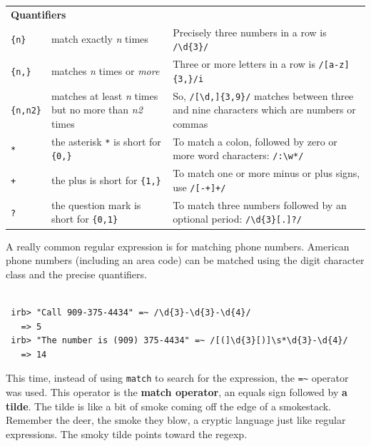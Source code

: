 \documentclass[10pt,twoside]{report}
\begin{document}
\begin{tabular}{p{}p{}p{}}
\multicolumn{3}{l}{\bf Quantifiers }
\\ \lstinline[breaklines=true]|{n}| & match exactly {\em n} times &
Precisely three numbers in a row is
\lstinline[breaklines=true]|/\d{3}/|
\\ \lstinline[breaklines=true]|{n,}| & matches {\em n} times or {\em
  more} & Three or more letters in a row is
\lstinline[breaklines=true]|/[a-z]{3,}/i|
\\ \lstinline[breaklines=true]|{n,n2}| & matches at least {\em n}
times but no more than {\em n2} times & So,
\lstinline[breaklines=true]|/[\d,]{3,9}/| matches between three and
nine characters which are numbers or commas
\\ \lstinline[breaklines=true]|*| & the asterisk
\lstinline[breaklines=true]|*| is short for
\lstinline[breaklines=true]|{0,}| & To match a colon, followed by zero
or more word characters: \lstinline[breaklines=true]|/:\w*/|
\\ \lstinline[breaklines=true]|+| & the plus is short for
\lstinline[breaklines=true]|{1,}| & To match one or more minus or plus
signs, use \lstinline[breaklines=true]|/[-+]+/|
\\ \lstinline[breaklines=true]|?| & the question mark is short for
\lstinline[breaklines=true]|{0,1}| & To match three numbers followed
by an optional period: \lstinline[breaklines=true]|/\d{3}[.]?/| \\
\end{tabular}

A really common regular expression is for matching phone numbers.
American phone numbers (including an area code) can be matched using
the digit character class and the precise quantifiers.


\begin{lstlisting}

 irb> "Call 909-375-4434" =~ /\d{3}-\d{3}-\d{4}/
   => 5
 irb> "The number is (909) 375-4434" =~ /[(]\d{3}[)]\s*\d{3}-\d{4}/
   => 14

\end{lstlisting}


This time, instead of using \lstinline[breaklines=true]|match| to
search for the expression, the \lstinline[breaklines=true]|=~|
operator was used.  This operator is the {\bf match operator}, an
equals sign followed by {\bf a tilde}.  The tilde is like a bit of
smoke coming off the edge of a smokestack.  Remember the deer, the
smoke they blow, a cryptic language just like regular expressions.
The smoky tilde points toward the regexp.
\end{document}
